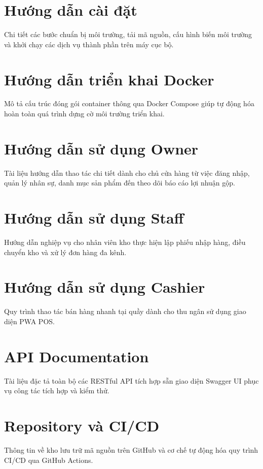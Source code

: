 \documentclass[12pt,a4paper]{report}
\begin{document}
	\section{Hướng dẫn cài đặt}
	Chi tiết các bước chuẩn bị môi trường, tải mã nguồn, cấu hình biến môi trường và khởi chạy các dịch vụ thành phần trên máy cục bộ.
	
	\section{Hướng dẫn triển khai Docker}
	Mô tả cấu trúc đóng gói container thông qua Docker Compose giúp tự động hóa hoàn toàn quá trình dựng cờ môi trường triển khai.
	
	\section{Hướng dẫn sử dụng Owner}
	Tài liệu hướng dẫn thao tác chi tiết dành cho chủ cửa hàng từ việc đăng nhập, quản lý nhân sự, danh mục sản phẩm đến theo dõi báo cáo lợi nhuận gộp.
	
	\section{Hướng dẫn sử dụng Staff}
	Hướng dẫn nghiệp vụ cho nhân viên kho thực hiện lập phiếu nhập hàng, điều chuyển kho và xử lý đơn hàng đa kênh.
	
	\section{Hướng dẫn sử dụng Cashier}
	Quy trình thao tác bán hàng nhanh tại quầy dành cho thu ngân sử dụng giao diện PWA POS.
	
	\section{API Documentation}
	Tài liệu đặc tả toàn bộ các RESTful API tích hợp sẵn giao diện Swagger UI phục vụ công tác tích hợp và kiểm thử.
	
	\section{Repository và CI/CD}
	Thông tin về kho lưu trữ mã nguồn trên GitHub và cơ chế tự động hóa quy trình CI/CD qua GitHub Actions.
	
\end{document}

